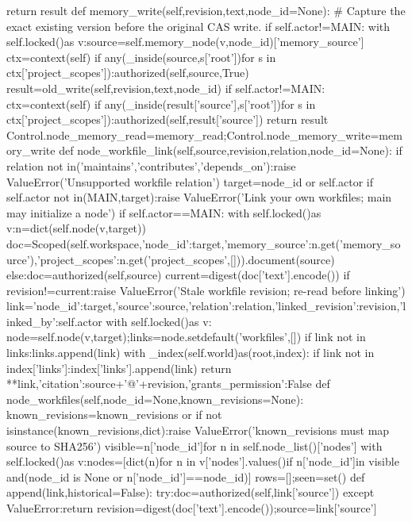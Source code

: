         return result
    def memory_write(self,revision,text,node_id=None):
        # Capture the exact existing version before the original CAS write.
        if self.actor!=MAIN:
            with self.locked()as v:source=self.memory_node(v,node_id)['memory_source']
            ctx=context(self)
            if any(_inside(source,s['root'])for s in ctx['project_scopes']):authorized(self,source,True)
        result=old_write(self,revision,text,node_id)
        if self.actor!=MAIN:
            ctx=context(self)
            if any(_inside(result['source'],s['root'])for s in ctx['project_scopes']):authorized(self,result['source'])
        return result
    Control.node_memory_read=memory_read;Control.node_memory_write=memory_write
    def node_workfile_link(self,source,revision,relation,node_id=None):
        if relation not in('maintains','contributes','depends_on'):raise ValueError('Unsupported workfile relation')
        target=node_id or self.actor
        if self.actor not in(MAIN,target):raise ValueError('Link your own workfiles; main may initialize a node')
        if self.actor==MAIN:
            with self.locked()as v:n=dict(self.node(v,target))
            doc=Scoped(self.workspace,{'node_id':target,'memory_source':n.get('memory_source'),'project_scopes':n.get('project_scopes',[])}).document(source)
        else:doc=authorized(self,source)
        current=digest(doc['text'].encode())
        if revision!=current:raise ValueError('Stale workfile revision; re-read before linking')
        link={'node_id':target,'source':source,'relation':relation,'linked_revision':revision,'linked_by':self.actor}
        with self.locked()as v:
            node=self.node(v,target);links=node.setdefault('workfiles',[])
            if link not in links:links.append(link)
        with _index(self.world)as(root,index):
            if link not in index['links']:index['links'].append(link)
        return {**link,'citation':source+'@'+revision,'grants_permission':False}
    def node_workfiles(self,node_id=None,known_revisions=None):
        known_revisions=known_revisions or{}
        if not isinstance(known_revisions,dict):raise ValueError('known_revisions must map source to SHA256')
        visible={n['node_id']for n in self.node_list()['nodes']}
        with self.locked()as v:nodes=[dict(n)for n in v['nodes'].values()if n['node_id']in visible and(node_id is None or n['node_id']==node_id)]
        rows=[];seen=set()
        def append(link,historical=False):
            try:doc=authorized(self,link['source'])
            except ValueError:return
            revision=digest(doc['text'].encode());source=link['source']

